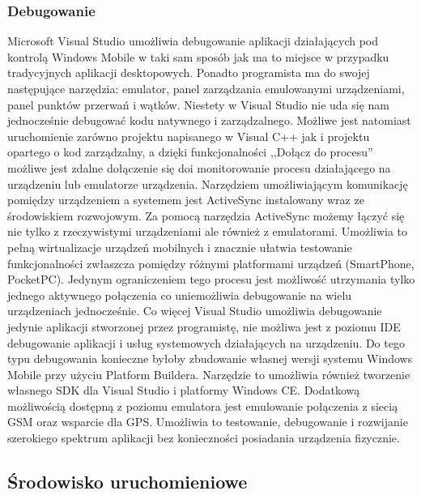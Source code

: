\subsubsection{Debugowanie}
Microsoft Visual Studio umożliwia debugowanie aplikacji działających pod
kontrolą Windows Mobile w taki sam sposób jak ma to miejsce w przypadku
tradycyjnych aplikacji desktopowych. Ponadto programista ma do swojej
następujące narzędzia: emulator, panel zarządzania emulowanymi urządzeniami,
panel punktów przerwań i wątków. Niestety w Visual Studio nie uda się nam
jednocześnie debugować kodu natywnego i zarządzalnego. Możliwe jest natomiast
uruchomienie zarówno projektu napisanego w Visual C++ jak i projektu opartego o
kod zarządzalny, a dzięki funkcjonalności ,,Dołącz do procesu'' możliwe jest
zdalne dołączenie się doi monitorowanie procesu działającego na urządzeniu lub
emulatorze urządzenia. Narzędziem umożliwiającym komunikację pomiędzy
urządzeniem a systemem jest ActiveSync instalowany wraz ze środowiskiem
rozwojowym.  Za pomocą narzędzia ActiveSync możemy łączyć się nie tylko z
rzeczywistymi urządzeniami ale również z emulatorami. Umożliwia to pełną
wirtualizacje urządzeń mobilnych i znacznie ułatwia testowanie funkcjonalności
zwłaszcza pomiędzy różnymi platformami urządzeń (SmartPhone, PocketPC). Jedynym
ograniczeniem tego procesu jest możliwość utrzymania tylko jednego aktywnego
połączenia co uniemożliwia debugowanie na wielu urządzeniach jednocześnie. Co
więcej Visual Studio umożliwia debugowanie jedynie aplikacji stworzonej przez
programistę, nie możliwa jest z poziomu IDE debugowanie aplikacji i usług
systemowych działających na urządzeniu. Do tego typu debugowania konieczne
byłoby zbudowanie własnej wersji systemu Windows Mobile przy użyciu Platform
Buildera. Narzędzie to umożliwia również tworzenie własnego SDK dla Visual
Studio i platformy Windows CE. Dodatkową możliwością dostępną z poziomu
emulatora jest emulowanie połączenia z siecią GSM oraz wsparcie dla GPS.
Umożliwia to testowanie, debugowanie i rozwijanie szerokiego spektrum aplikacji
bez konieczności posiadania urządzenia fizycznie.

\subsection{Środowisko uruchomieniowe}
